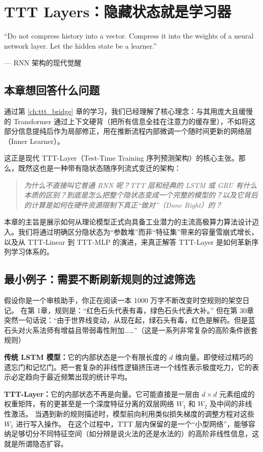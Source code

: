 \chapter{TTT Layers：隐藏状态就是学习器}
\label{ch:ttt_layers}

\epigraph{``Do not compress history into a vector. Compress it into the weights of a neural network layer. Let the hidden state be a learner.''}{--- RNN 架构的现代觉醒}

\section{本章想回答什么问题}

通过第 \ref{ch:ttt_bridge} 章的学习，我们已经理解了核心理念：与其用庞大且缓慢的 Transformer 通过上下文硬背（把所有信息全挂在注意力的缓存里），不如将这部分信息提纯后作为局部修正，用在推断流程内部微调一个随时间更新的网络层（Inner Learner）。

这正是现代 TTT-Layer（Test-Time Training 序列预测架构）的核心主张。那么，既然这也是一种带有隐状态随序列流式变迁的架构：
\begin{quote}
\textit{为什么不直接叫它普通 RNN 呢？TTT 层和经典的 LSTM 或 GRU 有什么本质的区别？到底是怎么把整个隐状态变成一个完整的模型的？以及它背后的计算是如何在硬件资源限制下真正“做对”（Done Right）的？}
\end{quote}

本章的主旨是展示如何从理论模型正式向具备工业潜力的主流高极算力算法设计迈入。我们将通过明确区分隐状态为“参数堆”而非“特征集”带来的容量雪崩式增长，以及从 TTT-Linear 到 TTT-MLP 的演进，来真正解答 TTT-Layer 是如何革新序列学习体系的。

\section{最小例子：需要不断刷新规则的过滤筛选}
\label{sec:ttt_layers_minimal}

\begin{toybox}[title=玩具问题 E：隐态参数容量的极限测试]
假设你是一个审核助手，你正在阅读一本 1000 万字不断改变时空规则的架空日记。
在第 1章，规则是：“红色石头代表有毒，绿色石头代表大补。”
但在第 30章突然一句话说：“由于世界线变动，从现在起，绿石头有毒，红色是解药。但是蓝石头对火系法师有增益且带弱毒性附加……”（这是一系列非常复杂的高阶条件嵌套规则）

\textbf{传统 LSTM 模型：}它的内部状态是一个有限长度的 $d$ 维向量。即使经过精巧的遗忘门和记忆门。把一套复杂的非线性逻辑挤压进一个线性表示极度吃力，它的表示必定趋向于最近频繁出现的统计平均。

\textbf{TTT-Layer：}它的内部状态不再是向量。它可能直接是一层由 $d \times d$ 元素组成的权重矩阵，有的更甚至是一个深度特征分离的双层网络 $W_1$ 和 $W_2$ 及中间的非线性激活。
当遇到新的规则描述时，模型前向利用类似损失梯度的调整方程对这些 $W_1$ 进行写入操作。
在这个过程中，TTT 层内保留的是一个“小型网络”，能够容纳足够切分不同特征空间（如分辨是说火法的还是水法的）的高阶非线性信息，这就是所谓隐态扩容。
\end{toybox}

